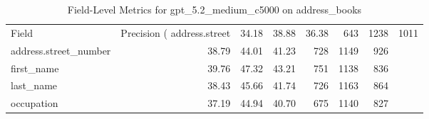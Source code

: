 \begin{table}
\caption{Field-Level Metrics for gpt_5.2_medium_c5000 on address_books}
\label{tab:fields_gpt_5.2_medium_c5000_address_books}
\begin{tabular}{lrrrrrr}
\toprule
Field & Precision (%
\midrule
address.street & 34.18 & 38.88 & 36.38 & 643 & 1238 & 1011 \\
address.street_number & 38.79 & 44.01 & 41.23 & 728 & 1149 & 926 \\
first_name & 39.76 & 47.32 & 43.21 & 751 & 1138 & 836 \\
last_name & 38.43 & 45.66 & 41.74 & 726 & 1163 & 864 \\
occupation & 37.19 & 44.94 & 40.70 & 675 & 1140 & 827 \\
\bottomrule
\end{tabular}
\end{table}
